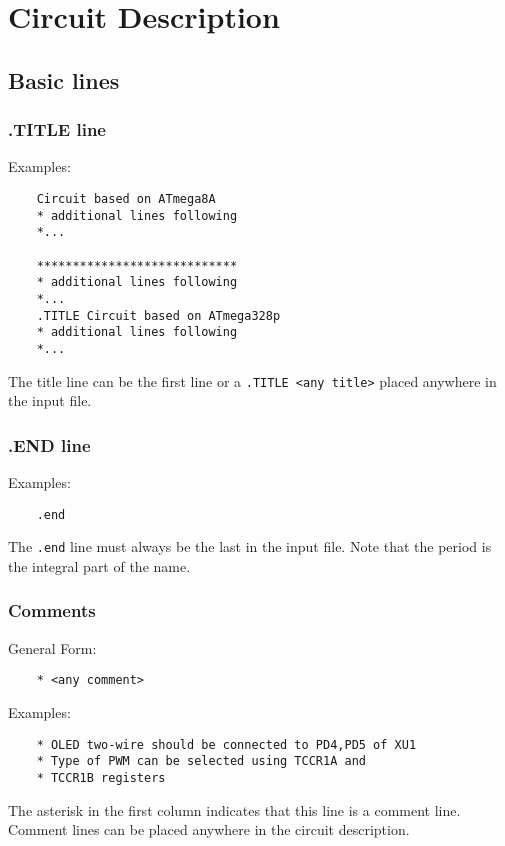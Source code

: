 \chapter{Circuit Description} \label{chapter:circuit_description}

\section{Basic lines}

\subsection{.TITLE line}
\textnormal{Examples:}
\begin{lstlisting}
	Circuit based on ATmega8A
	* additional lines following
	*...

	****************************
	* additional lines following
	*...
	.TITLE Circuit based on ATmega328p
	* additional lines following
	*...
\end{lstlisting}
\textnormal{The title line can be the first line or a
\lstinline|.TITLE <any title>| placed anywhere in the input file.}

\subsection{.END line}
\textnormal{Examples:}
\begin{lstlisting}
	.end
\end{lstlisting}
\textnormal{The \lstinline|.end| line must always be the last in the input
file. Note that the period is the integral part of the name.}

\subsection{Comments}
\textnormal{General Form:}
\begin{lstlisting}
	* <any comment>
\end{lstlisting}
\textnormal{Examples:}
\begin{lstlisting}
	* OLED two-wire should be connected to PD4,PD5 of XU1
	* Type of PWM can be selected using TCCR1A and
	* TCCR1B registers
\end{lstlisting}
\textnormal{The asterisk in the first column indicates that this line is
a comment line. Comment lines can be placed anywhere in the circuit
description.}

